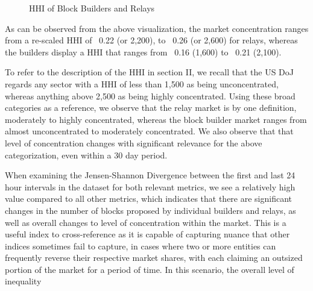 \documentclass[conference]{IEEEtran}
\begin{document}
\begin{figure}[ht]
\caption{HHI of Block Builders and Relays}
\label{fig:HHI block builder relays}
\end{figure}

As can be observed from the above visualization, the market concentration ranges from a re-scaled HHI of ~0.22 (or 2,200), to ~0.26 (or 2,600) for relays, whereas the builders display a HHI that ranges from ~0.16 (1,600) to ~0.21 (2,100).

To refer to the description of the HHI in section II, we recall that the US DoJ regards any sector with a HHI of less than 1,500 as being unconcentrated, whereas anything above 2,500 as being highly concentrated.  Using these broad categories as a reference, we observe that the relay market is by one definition, moderately to highly concentrated, whereas the block builder market ranges from almost unconcentrated to moderately concentrated.  We also observe that that level of concentration changes with significant relevance for the above categorization, even within a 30 day period.

When examining the Jensen-Shannon Divergence between the first and last 24 hour intervals in the dataset for both relevant metrics, we see a relatively high value compared to all other metrics, which indicates that there are significant changes in the number of blocks proposed by individual builders and relays, as well as overall changes to level of concentration within the market.  This is a useful index to cross-reference as it is capable of capturing nuance that other indices sometimes fail to capture, in cases where two or more entities can frequently reverse their respective market shares, with each claiming an outsized portion of the market for a period of time.  In this scenario, the overall level of inequality
\end{document}
